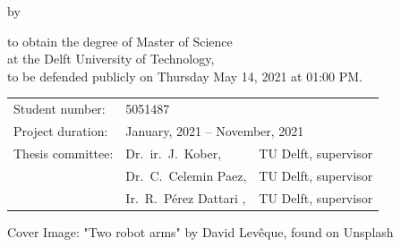 \begin{titlepage}

\begin{center}

{\makeatletter
\largetitlestyle\fontsize{45}{45}\selectfont\@title
\makeatother}

\bigskip

{\makeatletter
\ifdefvoid{\@subtitle}{}{\subfont\fontsize{20}{20}\selectfont\@subtitle}
\makeatother}

\bigskip
\bigskip

by

\bigskip
\bigskip

{\makeatletter
\largetitlestyle\fontsize{25}{25}\selectfont\@author
\makeatother}

\bigskip
\bigskip

to obtain the degree of Master of Science \\
at the Delft University of Technology, \\
to be defended publicly on Thursday May 14, 2021 at 01:00 PM.

\vfill

\begin{tabular}{lll}
    Student number: & 5051487 \\
        Project duration: & \multicolumn{2}{l}{January, 2021 -- November, 2021} \\
    Thesis committee: & Dr.\ ir.\ J.\ Kober, & TU Delft, supervisor \\
        & Dr.\ C.\ Celemin Paez, & TU Delft, supervisor \\
        & Ir.\ R.\ Pérez Dattari , & TU Delft, supervisor
\end{tabular}

\vspace{1cm}
\small{Cover Image: "Two robot arms" by David Levêque, found on Unsplash}

\end{center}


\end{titlepage}
